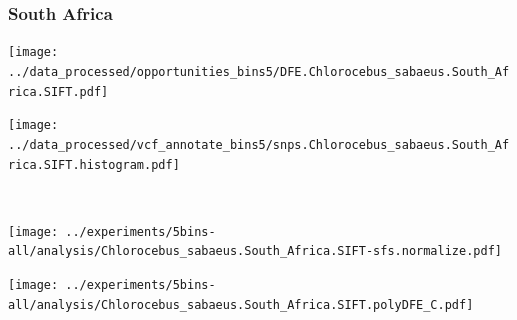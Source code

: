 \subsubsection{South Africa}

\begin{minipage}{0.49\linewidth}
    \texttt{[image: ../data\_processed/opportunities\_bins5/DFE.Chlorocebus\_sabaeus.South\_Africa.SIFT.pdf]}
\end{minipage}
\begin{minipage}{0.49\linewidth}
    \texttt{[image: ../data\_processed/vcf\_annotate\_bins5/snps.Chlorocebus\_sabaeus.South\_Africa.SIFT.histogram.pdf]}
\end{minipage}
\\
\begin{minipage}{0.49\linewidth}
    \texttt{[image: ../experiments/5bins-all/analysis/Chlorocebus\_sabaeus.South\_Africa.SIFT-sfs.normalize.pdf]}
\end{minipage}
\begin{minipage}{0.4\linewidth}
    \texttt{[image: ../experiments/5bins-all/analysis/Chlorocebus\_sabaeus.South\_Africa.SIFT.polyDFE\_C.pdf]}
\end{minipage}
